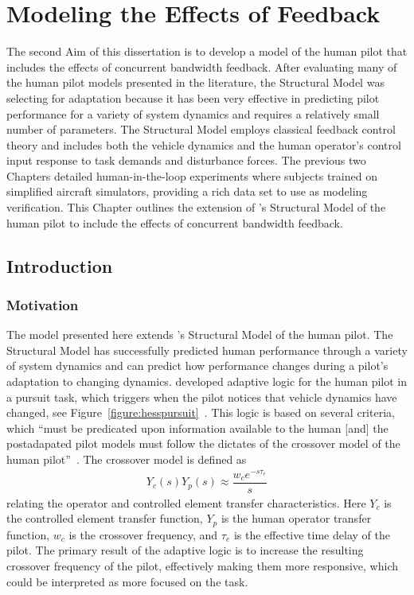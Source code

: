 \chapter{Modeling the Effects of Feedback}
\label{chapter:modeling}

The second Aim of this dissertation is to develop a model of the human pilot that includes the effects of concurrent bandwidth feedback.
After evaluating many of the human pilot models presented in the literature, the Structural Model was selecting for adaptation because it has been very effective in predicting pilot performance for a variety of system dynamics and requires a relatively small number of parameters.
The Structural Model employs classical feedback control theory and includes both the vehicle dynamics and the human operator's control input response to task demands and disturbance forces.
The previous two Chapters detailed human-in-the-loop experiments where subjects trained on simplified aircraft simulators, providing a rich data set to use as modeling verification.
This Chapter outlines the extension of \citeauthor{hess_unified_1997}'s Structural Model of the human pilot to include the effects of concurrent bandwidth feedback.

\section{Introduction}
\subsection{Motivation}
The model presented here extends \citeauthor{hess_unified_1997}'s \citeyear{hess_unified_1997} Structural Model of the human pilot.
The Structural Model has successfully predicted human performance through a variety of system dynamics and can predict how performance changes during a pilot's adaptation to changing dynamics.
\citeauthor{hess_modeling_2009} developed adaptive logic for the human pilot in a pursuit task, which triggers when the pilot notices that vehicle dynamics have changed, see Figure~\ref{figure:hesspursuit}~\citep{hess_modeling_2009}.
This logic is based on several criteria, which ``must be predicated upon information available to the human [and] the postadapated pilot models must follow the dictates of the crossover model of the human pilot''~\citep{hess_modeling_2009}.
The crossover model is defined as
\begin{align}
    Y_c(s) Y_p(s) \approx \dfrac{w_c e^{-s \tau_e}}{s}
\end{align}
relating the operator and controlled element transfer characteristics.
Here $Y_c$ is the controlled element transfer function, $Y_p$ is the human operator transfer function, $w_c$ is the crossover frequency, and $\tau_e$ is the effective time delay of the pilot.
The primary result of the adaptive logic is to increase the resulting crossover frequency of the pilot, effectively making them more responsive, which could be interpreted as more focused on the task.

